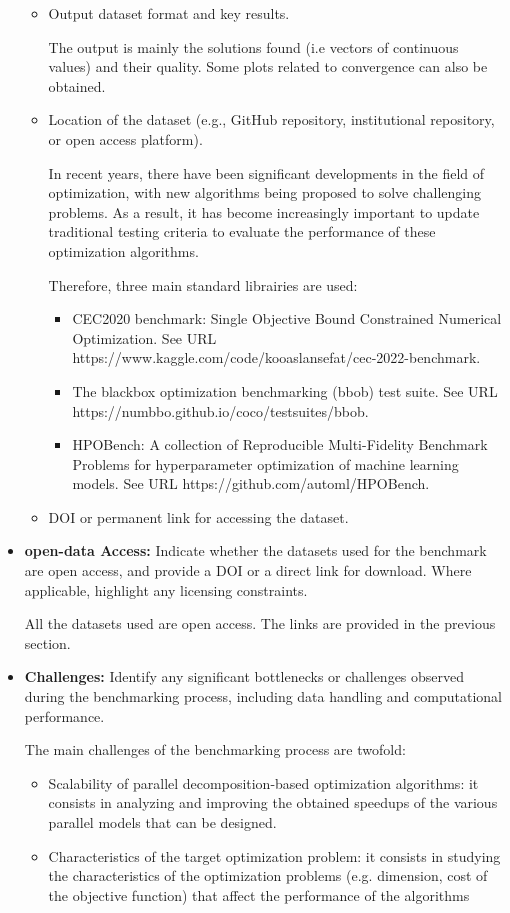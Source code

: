 \begin{itemize}
\begin{itemize}
\item Output dataset format and key results.

The output is mainly the solutions found (i.e vectors of continuous values) and their quality. Some plots related to convergence can also be obtained.

\item Location of the dataset (e.g., GitHub repository, institutional repository, or open access platform).

In recent years, there have been significant developments in the field of optimization, with new algorithms being proposed to solve challenging problems. As a result, it has become increasingly important to update traditional testing criteria to evaluate the performance of these optimization algorithms. 

Therefore, three main standard librairies are used:
\begin{itemize}
\item CEC2020 benchmark: Single Objective Bound Constrained Numerical Optimization. See URL https://www.kaggle.com/code/kooaslansefat/cec-2022-benchmark.
\item The blackbox optimization benchmarking (bbob) test suite. See URL https://numbbo.github.io/coco/testsuites/bbob.
\item HPOBench: A collection of Reproducible Multi-Fidelity Benchmark Problems for hyperparameter optimization of machine learning models. See URL https://github.com/automl/HPOBench.
\end{itemize}

\item DOI or permanent link for accessing the dataset.
\end{itemize}

\item \textbf{open-data Access:} Indicate whether the datasets used for the benchmark are open access, and provide a DOI or a direct link for download. Where applicable, highlight any licensing constraints.

All the datasets used are open access. The links are provided in the previous section.

\item \textbf{Challenges:} Identify any significant bottlenecks or challenges observed during the benchmarking process, including data handling and computational performance.

The main challenges of the benchmarking process are twofold:
\begin{itemize}
\item Scalability of parallel decomposition-based optimization algorithms: it consists in analyzing and improving the obtained speedups of the various parallel models that can be designed.
\item Characteristics of the target optimization problem: it consists in studying the characteristics of the optimization problems (e.g. dimension, cost of the objective function) that affect the performance of the algorithms 
\end{itemize}


\end{itemize}
